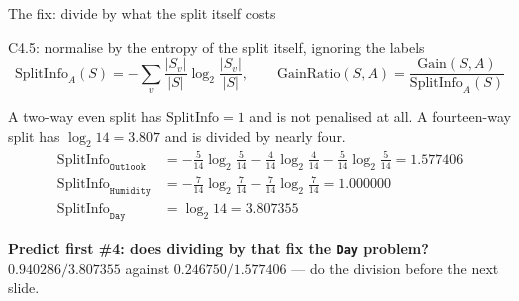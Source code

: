 \documentclass[aspectratio=169]{beamer}
\begin{document}
\begin{frame}[shrink=8]{The fix: divide by what the split itself costs}
  \begin{exampleblock}{C4.5: normalise by the entropy of the split itself, ignoring the labels}
    \[
      \mathrm{SplitInfo}_A(S) = -\sum_{v}\frac{|S_v|}{|S|}
         \log_2 \frac{|S_v|}{|S|},
      \qquad
      \mathrm{GainRatio}(S,A) = \frac{\mathrm{Gain}(S,A)}
                                     {\mathrm{SplitInfo}_A(S)}
    \]
  \end{exampleblock}
  A two-way even split has $\mathrm{SplitInfo} = 1$ and is not penalised at
  all. A fourteen-way split has $\log_2 14 = 3.807$ and is divided by nearly
  four.
  \begin{align*}
    \mathrm{SplitInfo}_{\texttt{Outlook}}
     &= -\tfrac{5}{14}\log_2\tfrac{5}{14} - \tfrac{4}{14}\log_2\tfrac{4}{14}
        - \tfrac{5}{14}\log_2\tfrac{5}{14} = 1.577406\\
    \mathrm{SplitInfo}_{\texttt{Humidity}}
     &= -\tfrac{7}{14}\log_2\tfrac{7}{14} - \tfrac{7}{14}\log_2\tfrac{7}{14}
        = 1.000000\\
    \mathrm{SplitInfo}_{\texttt{Day}} &= \log_2 14 = 3.807355
  \end{align*}
  \begin{center}\small
    \textbf{Predict first \#4: does dividing by that fix the \texttt{Day}
    problem?} $0.940286/3.807355$ against $0.246750/1.577406$ --- do the
    division before the next slide.
  \end{center}
\end{frame}
\end{document}
